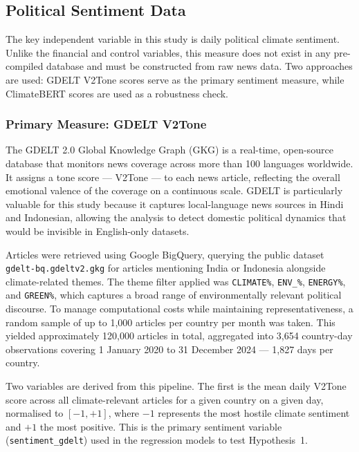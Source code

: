 \documentclass[12pt,a4paper]{article}
\begin{document}
\subsection{Political Sentiment Data}

The key independent variable in this study is daily political climate sentiment. Unlike the financial and control variables, this measure does not exist in any pre-compiled database and must be constructed from raw news data. Two approaches are used: GDELT V2Tone scores serve as the primary sentiment measure, while ClimateBERT scores are used as a robustness check.

\subsubsection{Primary Measure: GDELT V2Tone}

The GDELT 2.0 Global Knowledge Graph (GKG) is a real-time, open-source database that monitors news coverage across more than 100 languages worldwide. It assigns a tone score --- V2Tone --- to each news article, reflecting the overall emotional valence of the coverage on a continuous scale. GDELT is particularly valuable for this study because it captures local-language news sources in Hindi and Indonesian, allowing the analysis to detect domestic political dynamics that would be invisible in English-only datasets.

Articles were retrieved using Google BigQuery, querying the public dataset \texttt{gdelt-bq.gdeltv2.gkg} for articles mentioning India or Indonesia alongside climate-related themes. The theme filter applied was \texttt{CLIMATE\%}, \texttt{ENV\_\%}, \texttt{ENERGY\%}, and \texttt{GREEN\%}, which captures a broad range of environmentally relevant political discourse. To manage computational costs while maintaining representativeness, a random sample of up to 1,000 articles per country per month was taken. This yielded approximately 120,000 articles in total, aggregated into 3,654 country-day observations covering 1 January 2020 to 31 December 2024 --- 1,827 days per country.

Two variables are derived from this pipeline. The first is the mean daily V2Tone score across all climate-relevant articles for a given country on a given day, normalised to $[-1, +1]$, where $-1$ represents the most hostile climate sentiment and $+1$ the most positive. This is the primary sentiment variable (\texttt{sentiment\_gdelt}) used in the regression models to test Hypothesis~1.
\end{document}
